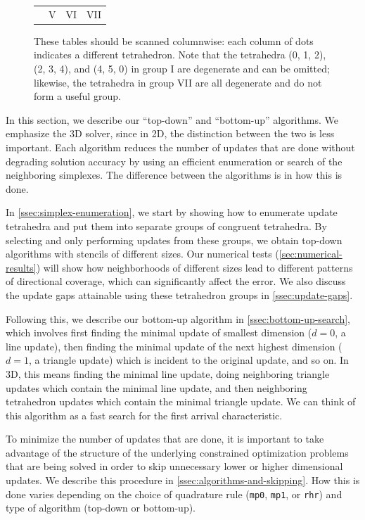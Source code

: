 \documentclass[eikonal.tex]{subfiles}
\begin{document}
\begin{figure}
{\begin{tabular}{c|cccccc|cccccc|ccc}
      \multicolumn{1}{c}{} & \multicolumn{6}{c}{V} & \multicolumn{6}{c}{VI} & \multicolumn{3}{c}{VII}
    \end{tabular}%
    \vspace{-0.75em}
  }
  \caption{These tables should be scanned columnwise: each column of
    dots indicates a different tetrahedron. Note that the tetrahedra
    (0, 1, 2), (2, 3, 4), and (4, 5, 0) in group I are degenerate and
    can be omitted; likewise, the tetrahedra in group VII are all
    degenerate and do not form a useful
    group.}\label{fig:tetrahedra-groups}
\end{figure}

In this section, we describe our ``top-down'' and ``bottom-up''
algorithms. We emphasize the 3D solver, since in 2D, the distinction
between the two is less important. Each algorithm reduces the number
of updates that are done without degrading solution accuracy by using
an efficient enumeration or search of the neighboring simplexes. The
difference between the algorithms is in how this is done.

In \cref{ssec:simplex-enumeration}, we start by showing how to
enumerate update tetrahedra and put them into separate groups of
congruent tetrahedra. By selecting and only performing updates from
these groups, we obtain top-down algorithms with stencils of different
sizes. Our numerical tests (\cref{sec:numerical-results}) will show
how neighborhoods of different sizes lead to different patterns of
directional coverage, which can significantly affect the error. We
also discuss the update gaps attainable using these tetrahedron groups
in \cref{ssec:update-gaps}.

Following this, we describe our bottom-up algorithm in
\cref{ssec:bottom-up-search}, which involves first finding the minimal
update of smallest dimension ($d = 0$, a line update), then finding
the minimal update of the next highest dimension ($d = 1$, a triangle
update) which is incident to the original update, and so on. In 3D,
this means finding the minimal line update, doing neighboring triangle
updates which contain the minimal line update, and then neighboring
tetrahedron updates which contain the minimal triangle update. We can
think of this algorithm as a fast search for the first arrival
characteristic.

To minimize the number of updates that are done, it is important to
take advantage of the structure of the underlying constrained
optimization problems that are being solved in order to skip
unnecessary lower or higher dimensional updates. We describe this
procedure in \cref{ssec:algorithms-and-skipping}. How this is done
varies depending on the choice of quadrature rule (\texttt{mp0},
\texttt{mp1}, or \texttt{rhr}) and type of algorithm (top-down or
bottom-up).
\end{document}
